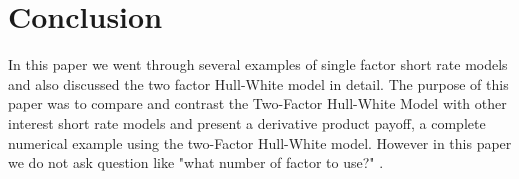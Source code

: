 \documentclass[11pt]{article}
\begin{document}
\section{Conclusion}

In this paper we went through several examples of single factor short rate models and also discussed the two factor Hull-White model in detail.   The purpose of this paper was to compare and contrast the Two-Factor Hull-White Model with other interest short rate models and present a derivative product payoff,  a complete numerical example using the two-Factor Hull-White model.  However in this paper we do not ask question like "what number of factor to use?" .

\newpage
\section*{} \label{bibsection}
\end{document}
